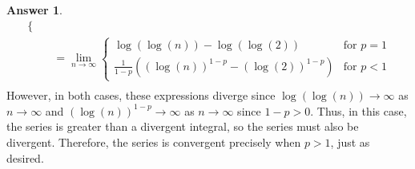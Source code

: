 \documentclass[10pt,a4paper]{article}
\theoremstyle{definition}
\newtheorem*{answer*}{Answer}
\begin{document}
\begin{answer*}{$ $}
\begin{align*}
\begin{cases}
\end{cases}\\
&= \lim_{n \to \infty} 
\begin{cases}
	\log(\log(n)) - \log(\log(2))  &\text{for $p = 1$}\\
	\frac{1}{1 - p}\left((\log(n))^{1 - p} - (\log(2))^{1 - p}\right) &\text{for $p < 1$}
\end{cases}\\
\end{align*}
However, in both cases, these expressions diverge since $\log(\log(n)) \to \infty$ as $n \to \infty$ and $(\log(n))^{1 - p} \to \infty$ as $n \to \infty$ since $1 - p > 0$. Thus, in this case, the series is greater than a divergent integral, so the series must also be divergent. Therefore, the series is convergent precisely when $p > 1$, just as desired. 
\end{answer*}
\end{document}
